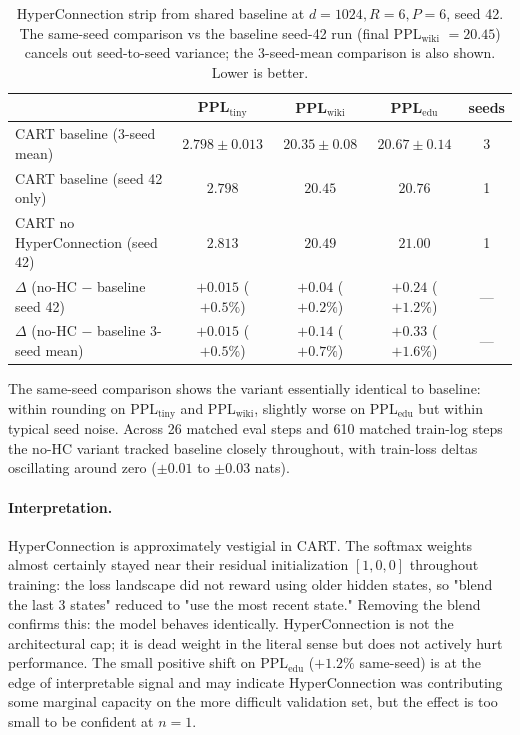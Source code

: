 \documentclass{article}
\newcommand{\cart}{\textsc{CART}}
\newcommand{\pplwiki}{PPL$_\text{wiki}$}
\newcommand{\ppltiny}{PPL$_\text{tiny}$}
\newcommand{\ppledu}{PPL$_\text{edu}$}
\begin{document}
\begin{table}[htbp]
\centering
\caption{HyperConnection strip from shared baseline at $d{=}1024, R{=}6, P{=}6$, seed 42. The same-seed comparison vs the baseline seed-42 run (final \pplwiki{} $= 20.45$) cancels out seed-to-seed variance; the 3-seed-mean comparison is also shown. Lower is better.}
\label{tab:abl_hc}
\footnotesize
\begin{tabular}{lcccc}
\toprule
 & \ppltiny & \pplwiki & \ppledu & seeds \\
\midrule
\cart{} baseline (3-seed mean)                        & $2.798 \pm 0.013$ & $20.35 \pm 0.08$ & $20.67 \pm 0.14$ & 3 \\
\cart{} baseline (seed 42 only)                       & $2.798$           & $20.45$          & $20.76$          & 1 \\
\cart{} no HyperConnection (seed 42)                  & $2.813$           & $20.49$          & $21.00$          & 1 \\
\midrule
$\Delta$ (no-HC $-$ baseline seed 42)                 & $+0.015$ ($+0.5\%$) & $+0.04$ ($+0.2\%$) & $+0.24$ ($+1.2\%$) & --- \\
$\Delta$ (no-HC $-$ baseline 3-seed mean)             & $+0.015$ ($+0.5\%$) & $+0.14$ ($+0.7\%$) & $+0.33$ ($+1.6\%$) & --- \\
\bottomrule
\end{tabular}
\end{table}

The same-seed comparison shows the variant essentially identical to baseline: within rounding on \ppltiny{} and \pplwiki{}, slightly worse on \ppledu{} but within typical seed noise. Across 26 matched eval steps and 610 matched train-log steps the no-HC variant tracked baseline closely throughout, with train-loss deltas oscillating around zero ($\pm 0.01$ to $\pm 0.03$ nats).

\paragraph{Interpretation.}
HyperConnection is approximately vestigial in \cart{}. The softmax weights almost certainly stayed near their residual initialization $[1, 0, 0]$ throughout training: the loss landscape did not reward using older hidden states, so "blend the last 3 states" reduced to "use the most recent state." Removing the blend confirms this: the model behaves identically. HyperConnection is not the architectural cap; it is dead weight in the literal sense but does not actively hurt performance. The small positive shift on \ppledu{} ($+1.2\%$ same-seed) is at the edge of interpretable signal and may indicate HyperConnection was contributing some marginal capacity on the more difficult validation set, but the effect is too small to be confident at $n{=}1$.
\end{document}
